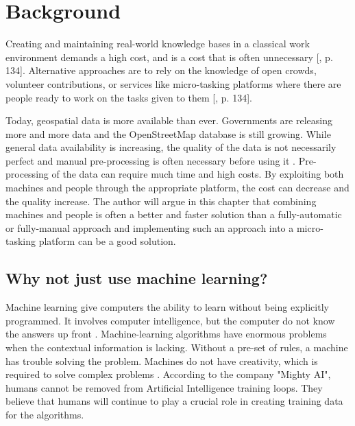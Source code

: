 \chapter{Background}

Creating and maintaining real-world knowledge bases in a classical work environment demands a high cost, and is a cost that is often unnecessary [\citep{Meier2013}, p. 134]. Alternative approaches are to rely on the knowledge of open crowds, volunteer contributions, or services like micro-tasking platforms where there are people ready to work on the tasks given to them [\citep{Meier2013}, p. 134].   

Today, geospatial data is more available than ever. Governments are releasing more and more data and the OpenStreetMap database is still growing. While general data availability is increasing, the quality of the data is not necessarily perfect and manual pre-processing is often necessary before using it \citep{Difallah2015}.  Pre-processing of the data can require much time and high costs. By exploiting both machines and people through the appropriate platform, the cost can decrease and the quality increase. The author will argue in this chapter that combining machines and people is often a better and faster solution than a fully-automatic or fully-manual approach and implementing such an approach into a micro-tasking platform can be a good solution. 

\section{Why not just use machine learning?}

Machine learning give computers the ability to learn without being explicitly programmed. It involves computer intelligence, but the computer do not know the answers up front \citep{StanfordUniversity2017}. Machine-learning algorithms have enormous problems when the contextual information is lacking. Without a pre-set of rules, a machine has trouble solving the problem. Machines do not have creativity, which is required to solve complex problems \citep{Holzinger2016a}. According to the company "Mighty AI", humans cannot be removed from Artificial Intelligence training loops. They believe that humans will continue to play a crucial role in creating training data for the algorithms. %

